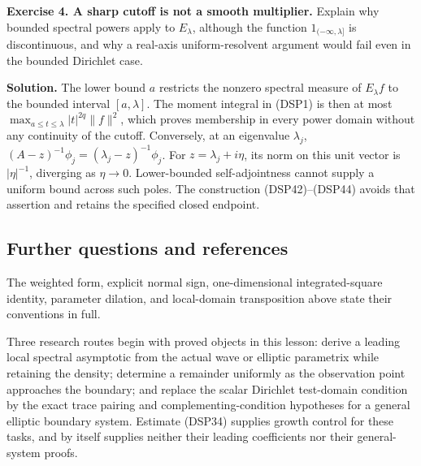 \documentclass[
  11pt,
]{article}
\makeatletter
\let\ReaderOriginalAnchorStart\hyper@anchorstart
\let\ReaderOriginalAnchorEnd\hyper@anchorend
\let\ReaderPendingAliases\@empty
\def\ReaderArmAliases#1{\gdef\ReaderPendingAliases{#1}}
\def\hyper@anchorstart#1{\ReaderIfNativeAnchorTF{#1}{\ReaderPendingAliases\global\let\ReaderPendingAliases\@empty}{}\ReaderOriginalAnchorStart{#1}}
\makeatother
\begin{document}
\textbf{Exercise 4. A sharp cutoff is not a smooth multiplier.} Explain
why bounded spectral powers apply to \(E_\lambda\), although the
function \(1_{(-\infty,\lambda]}\) is discontinuous, and why a real-axis
uniform-resolvent argument would fail even in the bounded Dirichlet
case.

\textbf{Solution.} The lower bound \(a\) restricts the nonzero spectral
measure of \(E_\lambda f\) to the bounded interval \([a,\lambda]\). The
moment integral in (DSP1) is then at most
\(\max_{a\leq t\leq\lambda}|t|^{2q}\|f\|^2\), which proves membership in
every power domain without any continuity of the cutoff. Conversely, at
an eigenvalue \(\lambda_j\),
\((A-z)^{-1}\phi_j=(\lambda_j-z)^{-1}\phi_j\). For
\(z=\lambda_j+i\eta\), its norm on this unit vector is \(|\eta|^{-1}\),
diverging as \(\eta\to0\). Lower-bounded self-adjointness cannot supply
a uniform bound across such poles. The construction (DSP42)--(DSP44)
avoids that assertion and retains the specified closed endpoint.

\ReaderArmAliases{\ReaderOriginalAnchorStart{antecedents-and-further-work}\ReaderOriginalAnchorEnd\begingroup\expandafter\def\csname @currentHref\endcsname{antecedents-and-further-work}\label{antecedents-and-further-work}\endgroup\ReaderOriginalAnchorStart{further-questions-and-references}\ReaderOriginalAnchorEnd}
\subsection{Further questions and
references}\label{further-questions-and-references}

The weighted form, explicit normal sign, one-dimensional
integrated-square identity, parameter dilation, and local-domain
transposition above state their conventions in full.

Three research routes begin with proved objects in this lesson: derive a
leading local spectral asymptotic from the actual wave or elliptic
parametrix while retaining the density; determine a remainder uniformly
as the observation point approaches the boundary; and replace the scalar
Dirichlet test-domain condition by the exact trace pairing and
complementing-condition hypotheses for a general elliptic boundary
system. Estimate (DSP34) supplies growth control for these tasks, and by
itself supplies neither their leading coefficients nor their
general-system proofs.

\ReaderArmAliases{\ReaderOriginalAnchorStart{editorial-supplement-the-complete-boundary-receivers-and-local-trace-consequences}\ReaderOriginalAnchorEnd}
\end{document}
